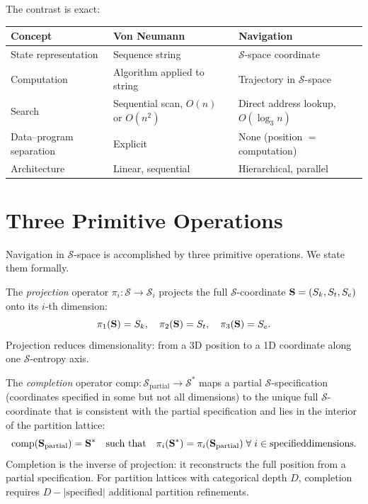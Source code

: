 The contrast is exact:
\begin{center}
\begin{tabular}{lll}
\toprule
Concept & Von Neumann & Navigation \\
\midrule
State representation & Sequence string & $\mathcal{S}$-space coordinate \\
Computation & Algorithm applied to string & Trajectory in $\mathcal{S}$-space \\
Search & Sequential scan, $O(n)$ or $O(n^2)$ & Direct address lookup, $O(\log_3 n)$ \\
Data--program separation & Explicit & None (position $=$ computation) \\
Architecture & Linear, sequential & Hierarchical, parallel \\
\bottomrule
\end{tabular}
\end{center}

\section{Three Primitive Operations}
\label{sec:primitives}

Navigation in $\mathcal{S}$-space is accomplished by three primitive
operations. We state them formally.

\begin{definition}
\label{def:project}
The \emph{projection} operator $\pi_i: \mathcal{S} \to \mathcal{S}_i$
projects the full $\mathcal{S}$-coordinate $\mathbf{S} = (S_k, S_t, S_e)$
onto its $i$-th dimension:
\begin{equation}
  \pi_1(\mathbf{S}) = S_k, \quad
  \pi_2(\mathbf{S}) = S_t, \quad
  \pi_3(\mathbf{S}) = S_e.
  \label{eq:project}
\end{equation}
Projection reduces dimensionality: from a 3D position to a 1D coordinate
along one $\mathcal{S}$-entropy axis.
\end{definition}

\begin{definition}
\label{def:complete}
The \emph{completion} operator $\mathrm{comp}: \mathcal{S}_{\mathrm{partial}} \to \mathcal{S}^*$
maps a partial $\mathcal{S}$-specification (coordinates specified in
some but not all dimensions) to the unique full $\mathcal{S}$-coordinate
that is consistent with the partial specification and lies in the interior
of the partition lattice:
\begin{equation}
  \mathrm{comp}(\mathbf{S}_{\mathrm{partial}}) = \mathbf{S}^*
    \quad\text{such that}\quad
  \pi_i(\mathbf{S}^*) = \pi_i(\mathbf{S}_{\mathrm{partial}})
    \;\forall\; i \in \mathrm{specified dimensions}.
  \label{eq:complete}
\end{equation}
Completion is the inverse of projection: it reconstructs the full
position from a partial specification. For partition lattices with
categorical depth $D$, completion requires $D - |\text{specified}|$
additional partition refinements.
\end{definition}

